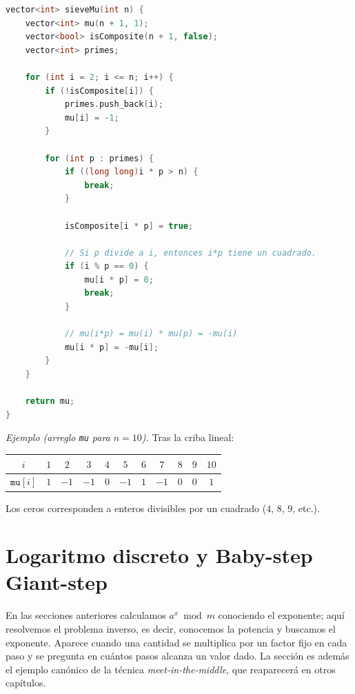\begin{lstlisting}[language=C++]
vector<int> sieveMu(int n) {
    vector<int> mu(n + 1, 1);
    vector<bool> isComposite(n + 1, false);
    vector<int> primes;

    for (int i = 2; i <= n; i++) {
        if (!isComposite[i]) {
            primes.push_back(i);
            mu[i] = -1;
        }

        for (int p : primes) {
            if ((long long)i * p > n) {
                break;
            }

            isComposite[i * p] = true;

            // Si p divide a i, entonces i*p tiene un cuadrado.
            if (i % p == 0) {
                mu[i * p] = 0;
                break;
            }

            // mu(i*p) = mu(i) * mu(p) = -mu(i)
            mu[i * p] = -mu[i];
        }
    }

    return mu;
}
\end{lstlisting}

\textit{Ejemplo (arreglo \texttt{mu} para $n=10$).} Tras la criba lineal:
\begin{center}
\small
\begin{tabular}{|c|c|c|c|c|c|c|c|c|c|c|}
\hline
$i$ & $1$ & $2$ & $3$ & $4$ & $5$ & $6$ & $7$ & $8$ & $9$ & $10$ \\
\hline
$\texttt{mu}[i]$ & $1$ & $-1$ & $-1$ & $0$ & $-1$ & $1$ & $-1$ & $0$ & $0$ & $1$ \\
\hline
\end{tabular}
\end{center}
Los ceros corresponden a enteros divisibles por un cuadrado ($4$, $8$, $9$, etc.).

\section{Logaritmo discreto y Baby-step Giant-step\adv}

En las secciones anteriores calculamos $a^x \bmod m$ conociendo el exponente; aquí resolvemos el problema inverso, es decir, conocemos la potencia y buscamos el exponente. Aparece cuando una cantidad se multiplica por un factor fijo en cada paso y se pregunta en cuántos pasos alcanza un valor dado. La sección es además el ejemplo canónico de la técnica \emph{meet-in-the-middle}, que reaparecerá en otros capítulos.

